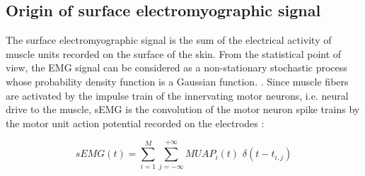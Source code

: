 \subsection{Origin of surface electromyographic signal}
The surface electromyographic signal is the sum of the electrical activity of muscle units recorded on the surface of the skin. From the statistical point of view, the EMG signal can be considered as a non-stationary stochastic process whose probability density function is a Gaussian function. \citep{DeLuca1984, DeLuca1979}. Since muscle fibers are activated by the impulse train of the innervating motor neurons, i.e. neural drive to the muscle, sEMG is the convolution of the motor neuron spike trains by the motor unit action potential recorded on the electrodes \citep{Farina2010, Farina2014}:

\begin{equation}
sEMG(t) = \sum_{i=1}^{M} \sum_{j=-\infty}^{+\infty} MUAP_i(t)\,\, \delta(t-t_{i,j})
\end{equation}

